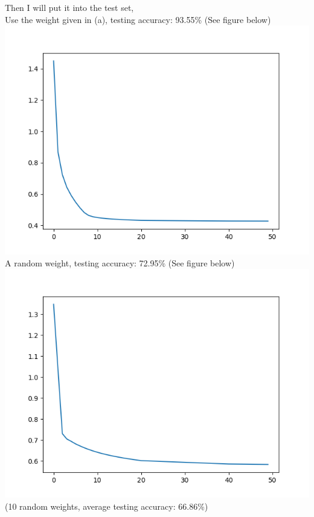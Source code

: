\documentclass[12pt]{article}
\begin{document}
Then I will put it into the test set, \\[0.4in]
Use the weight given in (a), testing accuracy: 93.55\% (See figure below)\\ 
\includegraphics[scale=0.5]{train_loss_q4c1}\\[0.4in]
A random weight, testing accuracy: 72.95\% (See figure below)\\
\includegraphics[scale=0.5]{train_loss_q4c2}\\[0.4in]
(10 random weights, average testing accuracy: 66.86\%) \\
\end{document}
